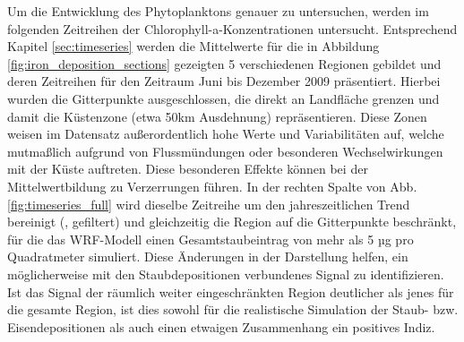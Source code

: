 \documentclass[12pt,a4paper,onecolumn,draft]{scrartcl}
\begin{document}
Um die Entwicklung des Phytoplanktons genauer zu untersuchen, werden im folgenden Zeitreihen der Chlorophyll-a-Konzentrationen untersucht. Entsprechend Kapitel \ref{sec:timeseries} werden die Mittelwerte für die in Abbildung \ref{fig:iron_deposition_sections} gezeigten 5 verschiedenen Regionen gebildet und deren Zeitreihen für den Zeitraum Juni bis Dezember 2009 präsentiert. Hierbei wurden die Gitterpunkte ausgeschlossen, die direkt an Landfläche grenzen und damit die Küstenzone (etwa 50km Ausdehnung) repräsentieren. Diese Zonen weisen im Datensatz außerordentlich hohe Werte und Variabilitäten auf, welche mutmaßlich aufgrund von Flussmündungen oder besonderen Wechselwirkungen mit der Küste auftreten. Diese besonderen Effekte können bei der Mittelwertbildung zu Verzerrungen führen. In der rechten Spalte von Abb. \ref{fig:timeseries_full} wird dieselbe Zeitreihe um den jahreszeitlichen Trend bereinigt (, gefiltert) und gleichzeitig die Region auf die Gitterpunkte beschränkt, für die das WRF-Modell einen Gesamtstaubeintrag von mehr als 5 µg pro Quadratmeter simuliert. Diese Änderungen in der Darstellung helfen, ein möglicherweise mit den Staubdepositionen verbundenes Signal zu identifizieren. Ist das Signal der räumlich weiter eingeschränkten Region deutlicher als jenes für die gesamte Region, ist dies sowohl für die realistische Simulation der Staub- bzw. Eisendepositionen als auch einen etwaigen Zusammenhang ein positives Indiz. 
\end{document}
